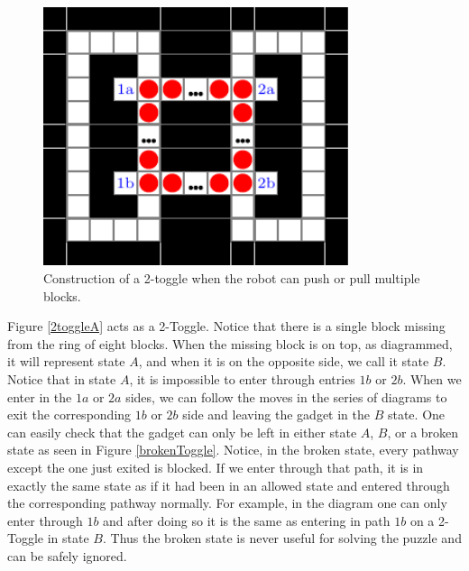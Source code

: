 \documentclass[11pt]{article}
\begin{document}
\begin{figure}[!ht]
  \centering
    \includegraphics[width=0.8\textwidth]{2ToggleK}
    \caption{Construction of a 2-toggle when the robot can push or pull multiple blocks.}
    \label{2ToggleK}
\end{figure}

Figure \ref{2toggleA} acts as a 2-Toggle. Notice that there is a single block missing from the ring of eight blocks. When the missing block is on top, as diagrammed, it will represent state $A$, and when it is on the opposite side, we call it state $B$. Notice that in state $A$, it is impossible to enter through entries $1b$ or $2b$. When we enter in the $1a$ or $2a$ sides, we can follow the moves in the series of diagrams to exit the corresponding $1b$ or $2b$ side and leaving the gadget in the $B$ state. One can easily check that the gadget can only be left in either state $A$, $B$, or a broken state as seen in Figure \ref{brokenToggle}. Notice, in the broken state, every pathway except the one just exited is blocked. If we enter through that path, it is in exactly the same state as if it had been in an allowed state and entered through the corresponding pathway normally. For example, in the diagram one can only enter through $1b$ and after doing so it is the same as entering in path $1b$ on a 2-Toggle in state $B$. Thus the broken state is never useful for solving the puzzle and can be safely ignored.
\end{document}
